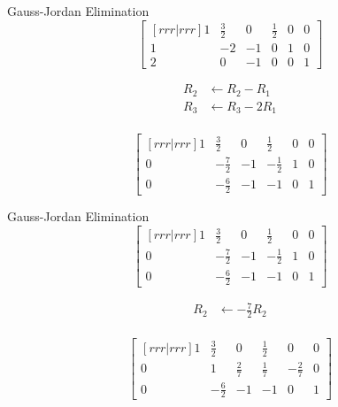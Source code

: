 \documentclass[serif,xcolor=pdftex,dvipsnames,table,hyperref={bookmarks=false,breaklinks}]{beamer}
\begin{document}
\begin{frame}[t]{Gauss-Jordan Elimination}
	$$\begin{bmatrix}[rrr|rrr]
    	1 & \frac{3}{2} & 0 & \frac{1}{2} & 0 & 0\\
		1 & -2 & -1 & 0 & 1 & 0\\
		2 & 0 & -1 & 0 & 0 & 1
	\end{bmatrix}$$
	
	\pause
	\begin{align*}
		R_2 &\leftarrow R_2 - R_1\\
		R_3 &\leftarrow R_3 - 2R_1\\
	\end{align*}
	
	\pause
	$$\begin{bmatrix}[rrr|rrr]
    	1 & \frac{3}{2} & 0 & \frac{1}{2} & 0 & 0\\
		0 & -\frac{7}{2} & -1 & -\frac{1}{2} & 1 & 0\\
		0 & -\frac{6}{2} & -1 & -1 & 0 & 1
	\end{bmatrix}$$
	
\end{frame}

\begin{frame}[t]{Gauss-Jordan Elimination}
	$$\begin{bmatrix}[rrr|rrr]
    	1 & \frac{3}{2} & 0 & \frac{1}{2} & 0 & 0\\
		0 & -\frac{7}{2} & -1 & -\frac{1}{2} & 1 & 0\\
		0 & -\frac{6}{2} & -1 & -1 & 0 & 1
	\end{bmatrix}$$
	
	\pause
	\begin{align*}
		R_2 &\leftarrow -\frac{7}{2}R_2\\
	\end{align*}
	
	\pause
	$$\begin{bmatrix}[rrr|rrr]
    	1 & \frac{3}{2} & 0 & \frac{1}{2} & 0 & 0\\
		0 & 1 & \frac{2}{7} & \frac{1}{7} & -\frac{2}{7} & 0\\
		0 & -\frac{6}{2} & -1 & -1 & 0 & 1
	\end{bmatrix}$$
	
\end{frame}
\end{document}
